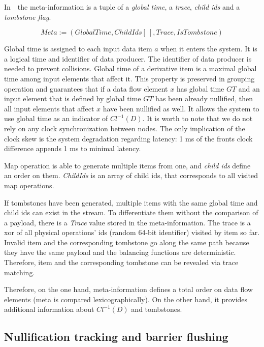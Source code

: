 In~\FlameStream\ the meta-information is a tuple of a {\it global time}, a {\it trace}, {\it child ids} and a {\it tombstone flag}.

\[Meta := (GlobalTime, ChildIds[\:], Trace, IsTombstone)\]

Global time is assigned to each input data item $a$ when it enters the system. It is a logical time and identifier of data producer. The identifier of data producer is needed to prevent collisions. Global time of a derivative item is a maximal global time among input elements that affect it. This property is preserved in grouping operation and guarantees that if a data flow element $x$ has global time $GT$ and an input element that is defined by global time $GT$ has been already nullified, then all input elements that affect $x$ have been nullified as well. It allows the system to use global time as an indicator of $Cl^{-1}(D)$. It is worth to note that we do not rely on any clock synchronization between nodes. The only implication of the clock skew is the system degradation regarding latency: 1 ms of the fronts clock difference appends 1 ms to minimal latency.

Map operation is able to generate multiple items from one, and {\em child ids} define an order on them. {\it ChildIds} is an array of child ids, that corresponds to all visited map operations.

If tombstones have been generated, multiple items with the same global time and child ids can exist in the stream. To differentiate them without the comparison of a payload, there is a {\it Trace} value stored in the meta-information. The trace is a xor of all physical operations' ids (random 64-bit identifier) visited by item so far. Invalid item and the corresponding tombstone go along the same path because they have the same payload and the balancing functions are deterministic. Therefore, item and the corresponding tombstone can be revealed via trace matching. 

Therefore, on the one hand, meta-information defines a total order on data flow elements (meta is compared lexicographically). On the other hand, it provides additional information about $Cl^{-1}(D)$ and tombstones.

\subsection{Nullification tracking and barrier flushing}


